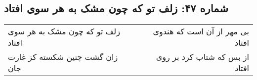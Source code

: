 \begin{center}
\section*{شماره ۴۷: زلف تو که چون مشک به هر سوی افتاد}
\label{sec:047}
\begin{longtable}{l p{0.5cm} r}
زلف تو که چون مشک به هر سوی افتاد
&&
بی مهر از آن است که هندوی افتاد
\\
زان گشت چنین شکسته کز غارت جان
&&
از بس که شتاب کرد بر روی افتاد
\\
\end{longtable}
\end{center}
